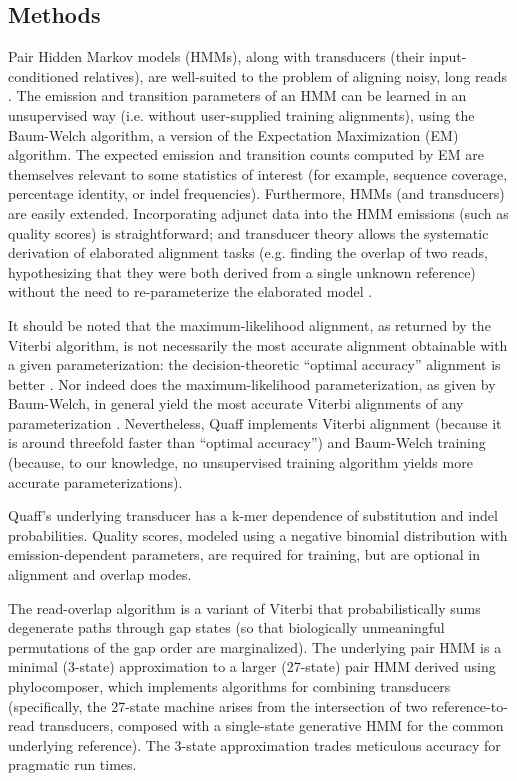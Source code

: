 \documentclass{bioinfo}
\begin{document}
\begin{methods}
\section{Methods}

Pair Hidden Markov models (HMMs), along with transducers (their input-conditioned relatives), are well-suited to the problem of aligning noisy, long reads \citep{Durbin1998-ps}. The emission and transition parameters of an HMM can be learned in an unsupervised way (i.e. without user-supplied training alignments), using the Baum-Welch algorithm, a version of the Expectation Maximization (EM) algorithm. The expected emission and transition counts computed by EM are themselves relevant to some statistics of interest (for example, sequence coverage, percentage identity, or indel frequencies). Furthermore, HMMs (and transducers) are easily extended. Incorporating adjunct data into the HMM emissions (such as quality scores) is straightforward; and transducer theory allows the systematic derivation of elaborated alignment tasks (e.g. finding the overlap of two reads, hypothesizing that they were both derived from a single unknown reference) without the need to re-parameterize the elaborated model \citep{Westesson2012-zg}.

It should be noted that the maximum-likelihood alignment, as returned by the Viterbi algorithm, is not necessarily the most accurate alignment obtainable with a given parameterization: the decision-theoretic ``optimal accuracy'' alignment is better \citep{Holmes1998-pr}. Nor indeed does the maximum-likelihood parameterization, as given by Baum-Welch, in general yield the most accurate Viterbi alignments of any parameterization \citep{Drasdo1998-hl}\citep{Frith2010-zj}. Nevertheless, Quaff implements Viterbi alignment (because it is around threefold faster than ``optimal accuracy'') and Baum-Welch training (because, to our knowledge, no unsupervised training algorithm yields more accurate parameterizations).

Quaff's underlying transducer has a k-mer dependence of substitution and indel probabilities. Quality scores, modeled using a negative binomial distribution with emission-dependent parameters, are required for training, but are optional in alignment and overlap modes.

The read-overlap algorithm is a variant of Viterbi that probabilistically sums degenerate paths through gap states (so that biologically unmeaningful permutations of the gap order are marginalized). The underlying pair HMM is a minimal (3-state) approximation to a larger (27-state) pair HMM derived using phylocomposer, which implements algorithms for combining transducers (specifically, the 27-state machine arises from the intersection of two reference-to-read transducers, composed with a single-state generative HMM for the common underlying reference). The 3-state approximation trades meticulous accuracy for pragmatic run times.


\end{methods}
\end{document}

